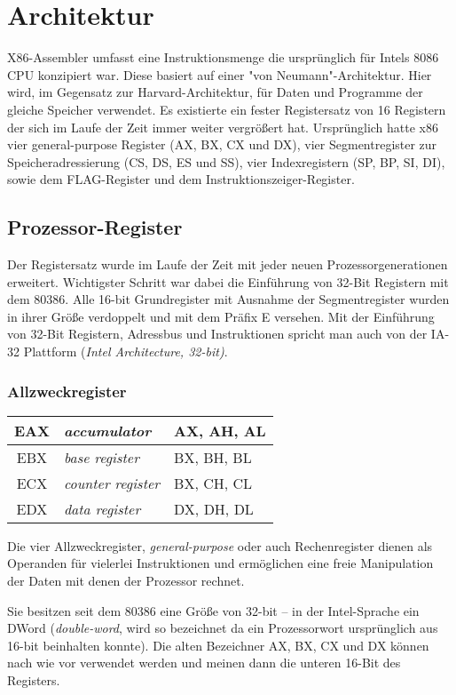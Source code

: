 \section{Architektur}
X86-Assembler umfasst eine Instruktionsmenge die ursprünglich für Intels 8086 CPU konzipiert war. Diese basiert auf einer "von Neumann"-Architektur. Hier wird, im Gegensatz zur Harvard-Architektur, für Daten und Programme der gleiche Speicher verwendet. Es existierte ein fester Registersatz von 16 Registern der sich im Laufe der Zeit immer weiter vergrößert hat. Ursprünglich hatte x86 vier general-purpose Register (AX, BX, CX und DX), vier Segmentregister zur Speicheradressierung (CS, DS, ES und SS), vier Indexregistern (SP, BP, SI, DI), sowie dem FLAG-Register und dem Instruktionszeiger-Register.

\subsection{Prozessor-Register}

Der Registersatz wurde im Laufe der Zeit mit jeder neuen Prozessorgenerationen erweitert. Wichtigster Schritt war dabei die Einführung von 32-Bit Registern mit dem 80386. Alle 16-bit Grundregister mit Ausnahme der Segmentregister wurden in ihrer Größe verdoppelt und mit dem Präfix E versehen. Mit der Einführung von 32-Bit Registern, Adressbus und Instruktionen spricht man auch von der IA-32 Plattform (\emph{Intel Architecture, 32-bit)}.

\subsubsection{Allzweckregister}

\begin{tabular}{|c|l|l|}
\hline EAX & \emph{accumulator} & AX, AH, AL \\
\hline EBX & \emph{base register} & BX, BH, BL \\
\hline ECX & \emph{counter register} & BX, CH, CL \\
\hline EDX & \emph{data register} & DX, DH, DL \\
\hline \end{tabular}

Die vier Allzweckregister, \emph{general-purpose} oder auch Rechenregister dienen als Operanden für vielerlei Instruktionen und ermöglichen eine freie Manipulation der Daten mit denen der Prozessor rechnet.

Sie besitzen seit dem 80386 eine Größe von 32-bit – in der Intel-Sprache ein DWord (\emph{double-word}, wird so bezeichnet da ein Prozessorwort ursprünglich aus 16-bit beinhalten konnte). Die alten Bezeichner AX, BX, CX und DX können nach wie vor verwendet werden und meinen dann die unteren 16-Bit des Registers.

